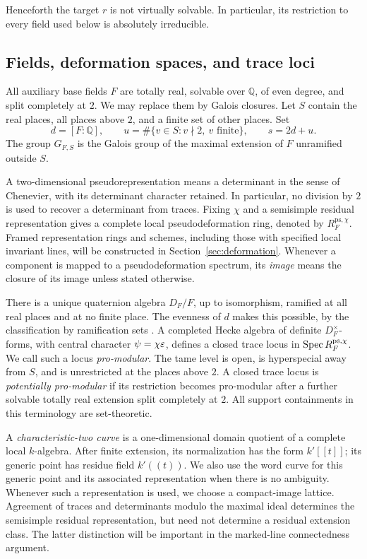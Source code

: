 Henceforth the target \(r\) is not virtually solvable.
In particular, its restriction to every field used below
is absolutely irreducible.

\subsection{Fields, deformation spaces, and trace loci}

All auxiliary base fields \(F\) are totally real, solvable
over \(\mathbb Q\), of even degree, and split completely at
\(2\). We may replace them by Galois closures. Let
\(S\) contain the real places, all places above \(2\), and
a finite set of other places. Set
\[
 d=[F:\mathbb Q],\qquad
 u=\#\{v\in S:v\nmid 2,\ v\text{ finite}\},\qquad
 s=2d+u.
\]
The group \(G_{F,S}\) is the Galois group of the maximal
extension of \(F\) unramified outside \(S\).

A two-dimensional pseudorepresentation means a determinant
in the sense of Chenevier, with its determinant character
retained. In particular, no division by \(2\) is used to
recover a determinant from traces. Fixing \(\chi\) and a
semisimple residual representation gives a complete local
pseudodeformation ring, denoted by \(R_F^{\mathrm{ps},\chi}\).
Framed representation rings and schemes, including those
with specified local invariant lines, will be constructed
in Section~\ref{sec:deformation}. Whenever a component is
mapped to a pseudodeformation spectrum, its \emph{image}
means the closure of its image unless stated otherwise.

There is a unique quaternion algebra \(D_F/F\), up to
isomorphism, ramified at all real places and at no finite
place. The evenness of \(d\) makes this possible, by the classification by
ramification sets \cite[Main Theorem~14.6.1]{Voight2021}.
A completed Hecke algebra of definite \(D_F^\times\)-forms,
with central character \(\psi=\chi\varepsilon\), defines a closed
trace locus in \(\operatorname{Spec} R_F^{\mathrm{ps},\chi}\).
We call such a locus \emph{pro-modular}. The tame level is
open, is hyperspecial away from \(S\), and is unrestricted
at the places above \(2\). A closed trace locus is
\emph{potentially pro-modular} if its restriction becomes
pro-modular after a further solvable totally real extension
split completely at \(2\). All support containments in this
terminology are set-theoretic.

A \emph{characteristic-two curve} is a one-dimensional
domain quotient of a complete local \(k\)-algebra. After
finite extension, its normalization has the form
\(k'[[t]]\); its generic point has residue field
\(k'((t))\). We also use the word curve for this generic
point and its associated representation when there is
no ambiguity. Whenever such a representation is used,
we choose a compact-image lattice. Agreement of traces
and determinants modulo the maximal ideal determines
the semisimple residual representation, but need not
determine a residual extension class. The latter
distinction will be important in the marked-line
connectedness argument.

